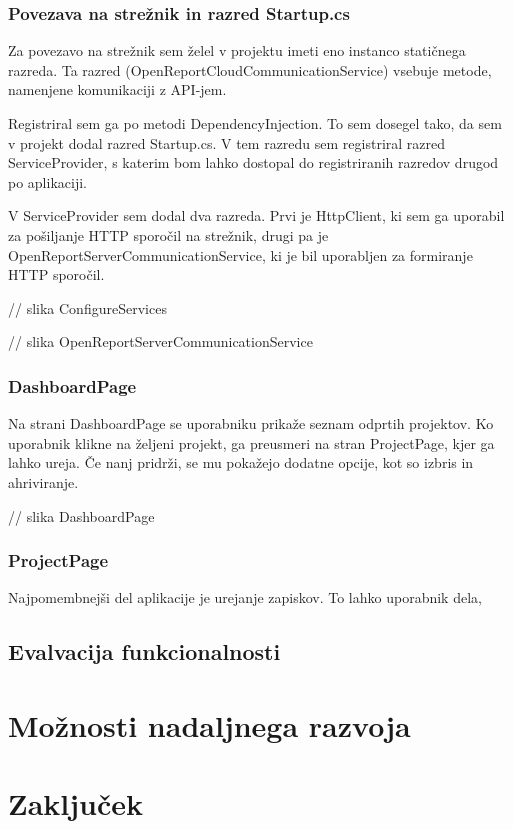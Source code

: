 \documentclass[a4paper, 12pt]{book}
\begin{document}
\subsection{Povezava na strežnik in razred Startup.cs}

Za povezavo na strežnik sem želel v projektu imeti eno instanco statičnega razreda.
Ta razred (OpenReportCloudCommunicationService) vsebuje metode, namenjene komunikaciji z API-jem.

Registriral sem ga po metodi DependencyInjection.
To sem dosegel tako, da sem v projekt dodal razred Startup.cs.
V tem razredu sem registriral razred ServiceProvider, s katerim bom lahko dostopal do registriranih razredov drugod po aplikaciji.

V ServiceProvider sem dodal dva razreda.
Prvi je HttpClient, ki sem ga uporabil za pošiljanje HTTP sporočil na strežnik, drugi pa je OpenReportServerCommunicationService, ki je bil uporabljen za formiranje HTTP sporočil.

// slika ConfigureServices

// slika OpenReportServerCommunicationService

\subsection{DashboardPage}

Na strani DashboardPage se uporabniku prikaže seznam odprtih projektov.
Ko uporabnik klikne na željeni projekt, ga preusmeri na stran ProjectPage, kjer ga lahko ureja.
Če nanj pridrži, se mu pokažejo dodatne opcije, kot so izbris in ahriviranje.

// slika DashboardPage

\subsection{ProjectPage}

Najpomembnejši del aplikacije je urejanje zapiskov.
To lahko uporabnik dela, 

\section{Evalvacija funkcionalnosti}

\chapter{Možnosti nadaljnega razvoja}
\chapter{Zaključek}
\end{document}
